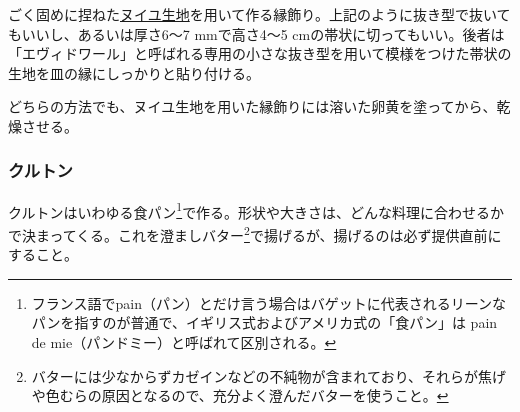 \begin{recette}
ごく固めに捏ねた\protect\hyperlink{nouilles}{ヌイユ生地}を用いて作る縁飾り。上記のように抜き型で抜いてもいいし、あるいは厚さ6〜7
mmで高さ4〜5
cmの帯状に切ってもいい。後者は「エヴィドワール」と呼ばれる専用の小さな抜き型を用いて模様をつけた帯状の生地を皿の縁にしっかりと貼り付ける。

どちらの方法でも、ヌイユ生地を用いた縁飾りには溶いた卵黄を塗ってから、乾燥させる。

\hypertarget{croutons}{%
\subsubsection{クルトン}\label{croutons}}



クルトンはいわゆる食パン\footnote{フランス語でpain（パン）とだけ言う場合はバゲットに代表されるリーンなパンを指すのが普通で、イギリス式およびアメリカ式の「食パン」は
  pain de mie（パンドミー）と呼ばれて区別される。}で作る。形状や大きさは、どんな料理に合わせるかで決まってくる。これを澄ましバター\footnote{バターには少なからずカゼインなどの不純物が含まれており、それらが焦げや色むらの原因となるので、充分よく澄んだバターを使うこと。}で揚げるが、揚げるのは必ず提供直前にすること。

\hypertarget{duxelles-seche}{%
}
\end{recette}

